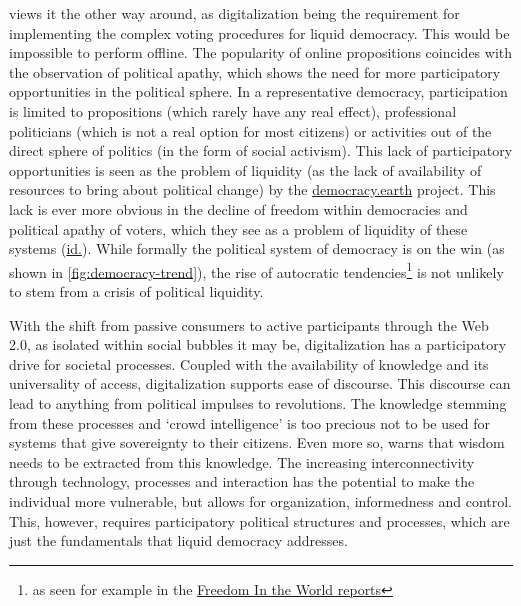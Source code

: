 \textcite{Bargmann2017} views it the other way around, as digitalization being the requirement for implementing the complex voting procedures for liquid democracy. This would be impossible to perform offline. 
The popularity of online propositions coincides with the observation of political apathy, which shows the need for more participatory opportunities in the political sphere. In a representative democracy, participation is limited to propositions (which rarely have any real effect), professional politicians (which is not a real option for most citizens) or activities out of the direct sphere of politics (in the form of social activism). This lack of participatory opportunities is seen as the problem of liquidity (as the lack of availability of resources to bring about political change) by the \href{https://www.democracy.earth/}{democracy.earth} project. This lack is ever more obvious in the decline of freedom within democracies and political apathy of voters, which they see as a problem of liquidity of these systems (\href{https://govfresh.com/2019/01/liquid-democracy-blockchains-and-governance-in-the-post-nation-state-era/}{id.}). While formally the political system of democracy is on the win (as shown in \autoref{fig:democracy-trend}), the rise of autocratic tendencies\footnote{as seen for example in the \href{https://freedomhouse.org/report/freedom-world/freedom-world-2019/democracy-in-retreat}{Freedom In the World reports}} is not unlikely to stem from a crisis of political liquidity.

With the shift from passive consumers to active participants through the Web 2.0, as isolated within social bubbles it may be, digitalization has a participatory drive for societal processes. Coupled with the availability of knowledge and its universality of access, digitalization supports ease of discourse. This discourse can lead to anything from political impulses to revolutions. The knowledge stemming from these processes and `crowd intelligence' is too precious not to be used for systems that give sovereignty to their citizens. Even more so, \textcite{Jonsdottir2015} warns that wisdom needs to be extracted from this knowledge.
The increasing interconnectivity through technology, processes and interaction has the potential to make the individual more vulnerable, but allows for organization, informedness and control. This, however, requires participatory political structures and processes, which are just the fundamentals that liquid democracy addresses.



